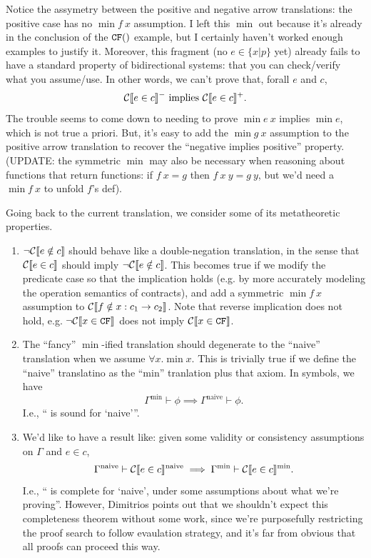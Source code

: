\documentclass[preprint]{sigplanconf}
\begin{document}
{Notice the assymetry between the positive and negative arrow
translations: the positive case has no $\min{f ~x}$ assumption.  I
left this $\min{}$ out because it's already in the 
conclusion of the $\cf$ example, but I certainly haven't
worked enough examples to justify it.  Moreover, this fragment
(no $e \in \{x|p\}$ yet) already fails to have a standard
property of bidirectional systems: that you can check/verify what you assume/use.
In other words, we can't prove that, forall $e$ and $c$,
\protect \[
  \mathcal{C} \llbracket e \in c \rrbracket^- \text{ implies } \mathcal{C} \llbracket e \in c \rrbracket^+.
\]
The trouble seems to come down to needing to prove $\min{e ~x}$ implies 
$\min{e}$, which is not true a priori.  But, it's easy to add the $\min{g ~x}$ 
assumption to the positive arrow translation to recover the
 ``negative implies positive'' property. (UPDATE: the symmetric $\min{}$
may also be necessary when reasoning about functions that return functions: if
$f ~x = g$ then $f ~x ~y = g ~y$, but we'd need a $\min{f ~x}$ to unfold $f$'s def).

Going back to the current translation, we consider some of its
metatheoretic properties.
\protect \begin{enumerate}
\item $\lnot \mathcal{C} \llbracket e \notin c \rrbracket$ should behave like a double-negation
  translation, in the sense that $\mathcal{C} \llbracket e \in c \rrbracket$ should imply
  $\lnot \mathcal{C} \llbracket e \notin c \rrbracket$.  This becomes true if we modify the
  predicate case so that the implication holds (e.g. by more accurately
  modeling the operation semantics of contracts), and add a symmetric 
  $\min{f ~x}$ assumption to $\mathcal{C} \llbracket f \notin x:c_1 \to c_2 \rrbracket$.  Note that
  reverse implication does not hold, e.g. $\lnot \mathcal{C} \llbracket x \in \texttt{CF} \rrbracket$ does
  not imply $\mathcal{C} \llbracket x \in \texttt{CF} \rrbracket$.
\item The ``fancy'' $\min{}$-ified translation should 
  degenerate to the ``naive'' translation when we assume $\forall x. \min{x}$.
  This is trivially true if we define the ``naive'' translatino as the ``min'' tranlation
  plus that axiom.  In symbols, we have
  \protect \[
  \Gamma^\text{min} \vdash \phi \implies \Gamma^\text{naive} \vdash \phi.
  \]  I.e., ``\min{} is sound for `naive'''.
\item We'd like to have a result  like: given some validity or consistency 
  assumptions on $\Gamma$ and $e \in c$,
  \protect \[
    \Gamma^\text{naive} \vdash \mathcal{C} \llbracket e \in c \rrbracket^\text{naive} \implies \Gamma^\text{min} \vdash \mathcal{C} \llbracket e \in c \rrbracket^\text{min}.
  \]  I.e., ``\min{} is complete for `naive', under some assumptions about 
  what we're proving''.  However, Dimitrios points out that we shouldn't expect this
  completeness theorem without some work, since we're purposefully 
  restricting the proof search to follow
  evaulation strategy, and it's far from obvious that all proofs can proceed this way.


\end{enumerate}}
\end{document}
